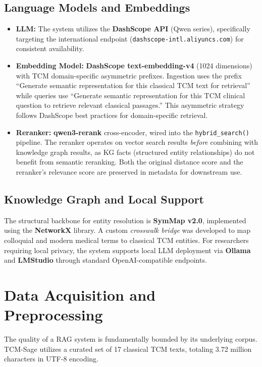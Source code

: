 \subsection{Language Models and Embeddings}
\begin{itemize}
    \item \textbf{LLM:} The system utilizes the \textbf{DashScope API} (Qwen series), specifically targeting the international endpoint (\texttt{dashscope-intl.aliyuncs.com}) for consistent availability.
    \item \textbf{Embedding Model:} \textbf{DashScope text-embedding-v4} (1024 dimensions) with TCM domain-specific asymmetric prefixes. Ingestion uses the prefix ``Generate semantic representation for this classical TCM text for retrieval'' while queries use ``Generate semantic representation for this TCM clinical question to retrieve relevant classical passages.'' This asymmetric strategy follows DashScope best practices for domain-specific retrieval.
    \item \textbf{Reranker:} \textbf{qwen3-rerank} cross-encoder, wired into the \texttt{hybrid\_search()} pipeline. The reranker operates on vector search results \textit{before} combining with knowledge graph results, as KG facts (structured entity relationships) do not benefit from semantic reranking. Both the original distance score and the reranker's relevance score are preserved in metadata for downstream use.
\end{itemize}

\subsection{Knowledge Graph and Local Support}
The structural backbone for entity resolution is \textbf{SymMap v2.0}, implemented using the \textbf{NetworkX} library. A custom \textit{crosswalk bridge} was developed to map colloquial and modern medical terms to classical TCM entities. For researchers requiring local privacy, the system supports local LLM deployment via \textbf{Ollama} and \textbf{LMStudio} through standard OpenAI-compatible endpoints.

\section{Data Acquisition and Preprocessing}

The quality of a RAG system is fundamentally bounded by its underlying corpus. TCM-Sage utilizes a curated set of 17 classical TCM texts, totaling 3.72 million characters in UTF-8 encoding.

